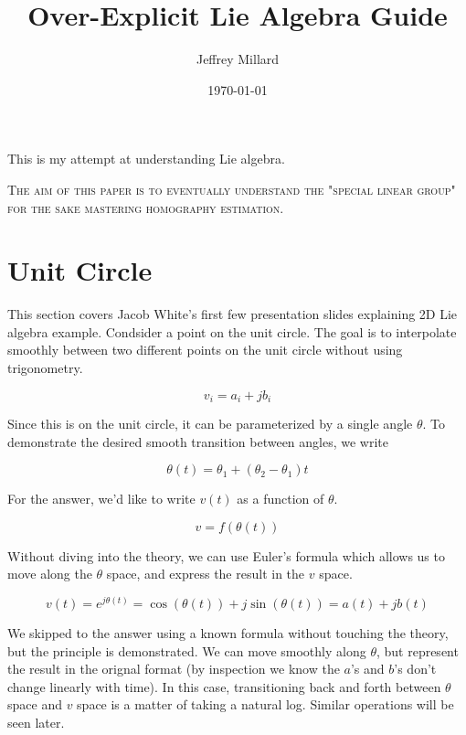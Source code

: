 \documentclass{article}
\title{Over-Explicit Lie Algebra Guide}
\date{\today}
\author{Jeffrey Millard}
\begin{document}
\maketitle

This is my attempt at understanding Lie algebra.

\textsc{The aim of this paper is to eventually understand the "special linear group" for the sake mastering homography estimation.}


\section{Unit Circle}
  This section covers Jacob White's first few presentation slides explaining 2D Lie algebra example. Condsider a point on the unit circle. The goal is to interpolate smoothly between two different points on the unit circle without using trigonometry.

  \begin{equation}
    v_i = a_i + jb_i
  \end{equation}

  Since this is on the unit circle, it can be parameterized by a single angle $\theta$. To demonstrate the desired smooth transition between angles, we write

  \begin{equation}
    \theta(t) = \theta_1 + (\theta_2-\theta_1)t
  \end{equation}

  For the answer, we'd like to write $v(t)$ as a function of $\theta$.

  \begin{equation}
    v = f(\theta(t))
  \end{equation}

  Without diving into the theory, we can use Euler's formula which allows us to move along the $\theta$ space, and express the result in the $v$ space.

  \begin{equation}
    v(t) = e^{j\theta(t)} = \cos(\theta(t)) + j\sin(\theta(t)) = a(t) + jb(t)
  \end{equation}

  We skipped to the answer using a known formula without touching the theory, but the principle is demonstrated. We can move smoothly along $\theta$, but represent the result in the orignal format (by inspection we know the $a$'s and $b$'s don't change linearly with time). In this case, transitioning back and forth between $\theta$ space and $v$ space is a matter of taking a natural log. Similar operations will be seen later.
\end{document}

